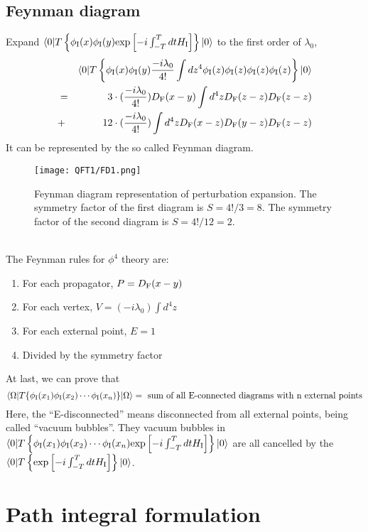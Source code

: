 \subsection{Feynman diagram}
Expand $\langle 0 | T \left\{ \phi_{\rm I}(x) \phi_{\rm I}(y) \mathrm{exp} \left[ -i \int_{-T}^{T} dt H_{\rm I} \right]\right\} | 0 \rangle$ to the first order of $\lambda_0$,
\begin{eqnarray}
& &\langle 0 | T \left\{ \phi_{\rm I}(x) \phi_{\rm I}(y) \frac{-i\lambda_0}{4!} \int dz^4 \phi_{\rm I}(z) \phi_{\rm I}(z) \phi_{\rm I}(z) \phi_{\rm I}(z) \right\} | 0 \rangle \nonumber \\
&=& 3 \cdot (\frac{-i\lambda_0}{4!}) D_{\rm F}(x-y) \int d^4 z D_{\rm F}(z-z) D_{\rm F}(z-z) \nonumber \\
&+& 12 \cdot (\frac{-i\lambda_0}{4!}) \int d^4 z  D_{\rm F}(x-z) D_{\rm F}(y-z) D_{\rm F}(z-z) \nonumber
\end{eqnarray}
It can be represented by the so called Feynman diagram.
\begin{figure}[!h]
\centering
\texttt{[image: QFT1/FD1.png]}
\caption{Feynman diagram representation of perturbation expansion. The symmetry factor of the first diagram is $S = 4!/3 = 8$. The symmetry factor of the second diagram is $S = 4!/12 = 2$.}
\end{figure}
\\
The Feynman rules for $\phi^4$ theory are:
\begin{enumerate}
\item For each propagator, $P = D_{\rm F}(x-y)$
\item For each vertex, $V = (-i\lambda_0)\int d^4z$
\item For each external point, $E=1$
\item Divided by the symmetry factor
\end{enumerate}
At last, we can prove that
\[\langle \Omega | T \{ \phi_{\rm I}(x_1) \phi_{\rm I}(x_2) \cdots \phi_{\rm I}(x_n) \} | \Omega \rangle = \mbox{ sum of all E-connected diagrams with n external points}\]
Here, the ``E-disconnected'' means disconnected from all external points, being called ``vacuum bubbles''. They vacuum bubbles in $\langle 0 | T \left\{ \phi_{\rm I}(x_1) \phi_{\rm I}(x_2) \cdots \phi_{\rm I}(x_n) \mathrm{exp} \left[ -i \int_{-T}^{T} dt H_{\rm I} \right]\right\} | 0 \rangle$ are all cancelled by the $\langle 0 | T \left\{ \mathrm{exp} \left[ -i \int_{-T}^{T} dt H_{\rm I} \right]\right\} | 0 \rangle$.

\section{Path integral formulation}
